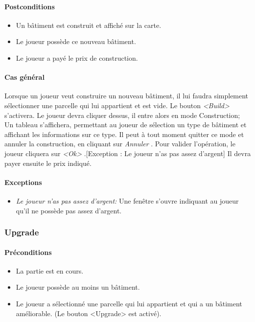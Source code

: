 \documentclass[a4paper,11pt]{report}
\begin{document}
\paragraph{Postconditions}
\begin{itemize}
 \item Un bâtiment est construit et affiché sur la carte.
 \item Le joueur possède ce nouveau bâtiment.
 \item Le joueur a payé le prix de construction.
\end{itemize}
\paragraph{Cas général}
Lorsque un joueur veut construire un nouveau bâtiment, il lui faudra simplement sélectionner une parcelle qui lui appartient et est vide. Le bouton \og \textit{<Build>} \fg s'activera. Le joueur devra cliquer dessus, il entre alors en mode Construction; Un tableau s'affichera, permettant au joueur de sélection un type de bâtiment et affichant les informations sur ce type. Il peut à tout moment quitter ce mode et annuler la construction, en cliquant sur \og \textit{Annuler} \fg. Pour valider l'opération, le joueur cliquera sur \og \textit{<Ok>} \fg.[Exception : Le joueur n'as pas assez d'argent] Il devra payer ensuite le prix indiqué.
\paragraph{Exceptions}
\begin{itemize}
 \item \textit{Le joueur n'as pas assez d'argent:}  Une fenêtre s'ouvre indiquant au joueur qu'il ne possède pas assez d'argent.
\end{itemize}
\subsubsection{Upgrade}
\paragraph{Préconditions}
\begin{itemize}
 \item La partie est en cours.
 \item Le joueur possède au moins un bâtiment.
 \item Le joueur a sélectionné une parcelle qui lui appartient et qui a un bâtiment améliorable. (Le bouton <Upgrade> est activé).
\end{itemize}
\end{document}
